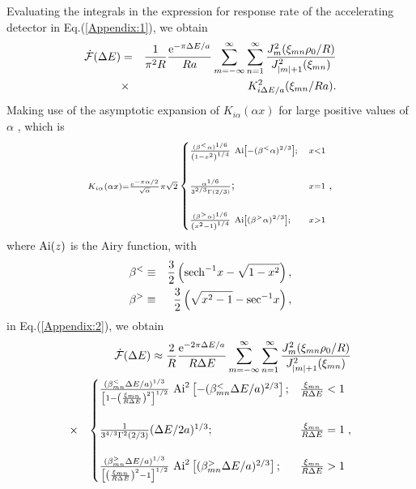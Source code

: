 \documentclass[aps,prl,nofootinbib,preprintnumbers,floatfix,twocolumn,superscriptaddress]{revtex4}
\def\nn{\nonumber}
\def\nn{\nonumber}
\def\l{\left}
\def\r{\right}
\def\f{\frac}
\def\e{{\rm e}}
\begin{document}
Evaluating the integrals in the expression for response rate of the 
accelerating detector in Eq.(\ref{Appendix:1}), we obtain 
\begin{eqnarray}
\label{Appendix:2}
 {\dot {\cal F}}(\Delta E)&=&\f{1}{\pi^2 R} \f{\e^{-\pi\Delta E/a}}{Ra} 
 \sum_{m=-\infty}^{\infty} \sum_{n=1}^{\infty}
 \f{J_{m}^2(\xi_{mn} \rho_0/R)}{J^2_{|m|+1}(\xi_{mn})} \nn \\
 &\times& K_{i\Delta E/a}^2(\xi_{mn}/Ra). 
\end{eqnarray}
Making use of the asymptotic expansion of $K_{i\alpha}(\alpha x)$ 
for large positive values of $\alpha$ \cite{Olver:1974}, which is 
\begin{eqnarray}
{\scriptstyle 
K_{i\alpha}(\alpha x)=\f{\e^{-\pi \alpha/2}}{\sqrt{\alpha}} \pi \sqrt{2}}
 \begin{cases}
 {\scriptstyle \f{(\beta^{<} \alpha)^{1/6}}
 {\l(1-x^2\r)^{1/4}}~
 {\rm Ai}\left[-(\beta^{<} \alpha)^{2/3}\right];} & {\scriptstyle x<1}  \\ \\
 {\scriptstyle \f{\alpha^{1/6}}{3^{2/3} \Gamma(2/3)}}; & {\scriptstyle x=1} \\ \\
 {\scriptstyle \f{(\beta^{>} \alpha)^{1/6}}
 {\l(x^2-1\r)^{1/4}}~
 {\rm Ai}\left[(\beta^{>} \alpha)^{2/3}\right];} & {\scriptstyle x>1}
 \end{cases}, 
\end{eqnarray}
where ${\rm Ai}(z)$ is the Airy function, with 
\begin{eqnarray}
 \beta^{<} &\equiv& \f{3}{2} \l({\rm sech}^{-1}x
 -\sqrt{1-x^2}\r), \\ 
 \beta^{>} &\equiv& \f{3}{2} \l(\sqrt{x^2-1}
 -{\rm sec}^{-1}x\r),
\end{eqnarray}
in Eq.(\ref{Appendix:2}), we obtain 
\begin{eqnarray}
 & & {\dot {\cal F}}(\Delta E) \approx 
 \f{2}{R} \f{\e^{-2\pi\Delta E/a}}{R\Delta E}
 \sum_{m=-\infty}^{\infty} \sum_{n=1}^{\infty}
 \f{J_{m}^2(\xi_{mn} \rho_0/R)}{J^2_{|m|+1}(\xi_{mn})} \\
 &\times&
 \begin{cases} 
 \f{(\beta_{mn}^{<} \Delta E/a)^{1/3}}
 {\left[1-\l(\f{\xi_{mn}}{R\Delta E}\r)^2\right]^{1/2}}~
 {\rm Ai}^2 \left[-(\beta_{mn}^{<}\Delta E/a)^{2/3}\right]; & \f{\xi_{mn}}{R\Delta E} < 1 \\ \\ 
 \f{1}{3^{4/3} \Gamma^2(2/3)} (\Delta E/2a)^{1/3}; & \f{\xi_{mn}}{R\Delta E}=1  \\ \\ 
 \f{(\beta_{mn}^{>} \Delta E/a)^{1/3}}
 {\left[\l(\f{\xi_{mn}}{R\Delta E}\r)^2-1\right]^{1/2}}~
 {\rm Ai}^2\left[(\beta_{mn}^{>} \Delta E/a)^{2/3}\right]; & \f{\xi_{mn}}{R\Delta E} > 1
 \end{cases}, \nn
\end{eqnarray}
\end{document}
